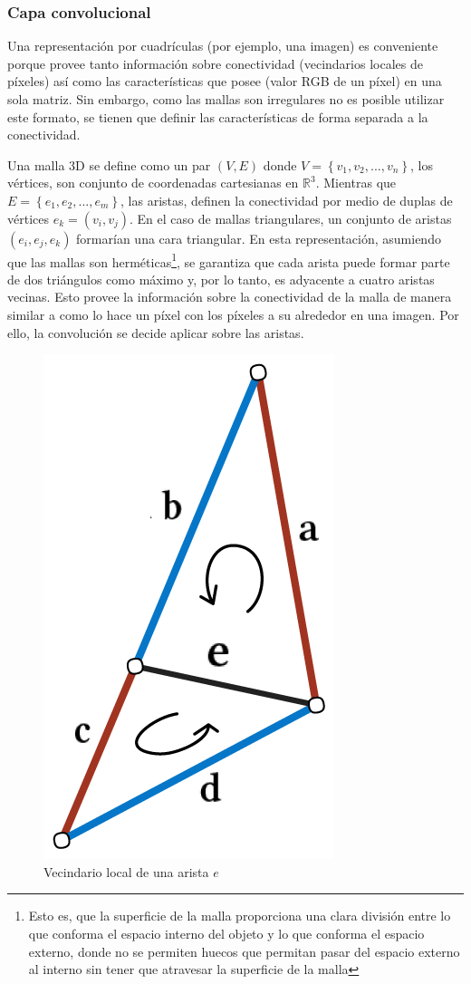 \subsubsection{Capa convolucional}
Una representación por cuadrículas (por ejemplo, una imagen) es conveniente porque provee tanto información sobre conectividad (vecindarios locales de píxeles) así como las características que posee (valor RGB de un píxel) en una sola matriz. Sin embargo, como las mallas son irregulares no es posible utilizar este formato, se tienen que definir las características de forma separada a la conectividad.

Una malla 3D se define como un par $(V,E)$ donde $V=\left\{v_1, v_2, ..., v_n \right\}$, los vértices, son conjunto de coordenadas cartesianas en $\mathbb{R}^3$. Mientras que $E=\left\{e_1, e_2, ..., e_m\right\}$, las aristas, definen la conectividad por medio de duplas de vértices $e_k=(v_i, v_j)$. En el caso de mallas triangulares, un conjunto de aristas $(e_i, e_j, e_k)$ formarían una cara triangular. 
En esta representación, asumiendo que las mallas son herméticas\footnote{Esto es, que la superficie de la malla proporciona una clara división entre lo que conforma el espacio interno del objeto y lo que conforma el espacio externo, donde no se permiten huecos que permitan pasar del espacio externo al interno sin tener que atravesar la superficie de la malla}, se garantiza que cada arista puede formar parte de dos triángulos como máximo y, por lo tanto, es adyacente a cuatro aristas vecinas. Esto provee la información sobre la conectividad de la malla de manera similar a como lo hace un píxel con los píxeles a su alrededor en una imagen. Por ello, la convolución se decide aplicar sobre las aristas.

\begin{figure}[h]
    \centering
    \includegraphics[width=0.3\linewidth]{imagenes/methods/mesh_conv.png}
    \caption[MeshCNN: Vecindario local de una arista]{Vecindario local de una arista $e$}
    \label{fig:mesh_conv}
\end{figure}

